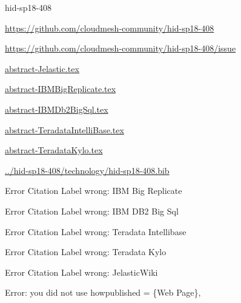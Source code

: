 \begin{IU}

hid-sp18-408

\url{https://github.com/cloudmesh-community/hid-sp18-408}

\url{https://github.com/cloudmesh-community/hid-sp18-408/issue}

\href{https://github.com/cloudmesh-community/hid-sp18-408/blob/master//technology/abstract-Jelastic.tex}{abstract-Jelastic.tex}

\href{https://github.com/cloudmesh-community/hid-sp18-408/blob/master//technology/abstract-IBMBigReplicate.tex}{abstract-IBMBigReplicate.tex}

\href{https://github.com/cloudmesh-community/hid-sp18-408/blob/master//technology/abstract-IBMDb2BigSql.tex}{abstract-IBMDb2BigSql.tex}

\href{https://github.com/cloudmesh-community/hid-sp18-408/blob/master//technology/abstract-TeradataIntelliBase.tex}{abstract-TeradataIntelliBase.tex}

\href{https://github.com/cloudmesh-community/hid-sp18-408/blob/master//technology/abstract-TeradataKylo.tex}{abstract-TeradataKylo.tex}

\href{https://github.com/cloudmesh-community/hid-sp18-408/blob/master//technology/hid-sp18-408.bib}{../hid-sp18-408/technology/hid-sp18-408.bib}

 Error Citation Label wrong: IBM Big Replicate

 Error Citation Label wrong: IBM DB2 Big Sql

 Error Citation Label wrong: Teradata Intellibase

 Error Citation Label wrong: Teradata Kylo

 Error Citation Label wrong: JelasticWiki

Error: you did not use howpublished = \{Web Page\},

\end{IU}


